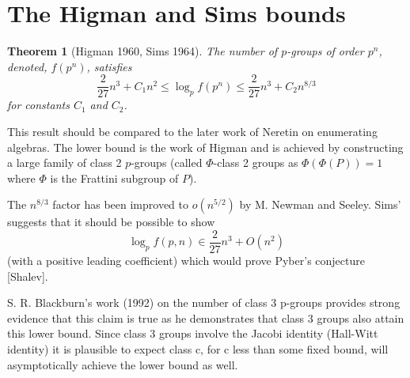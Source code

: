 \documentclass[12pt]{article}
\newtheorem{thm}{Theorem}
\begin{document}
\section{The Higman and Sims bounds}

\begin{thm}[Higman 1960, Sims 1964]
The number of $p$-groups of order $p^n$, denoted, $f(p^n)$, satisfies
	\[\frac{2}{27}n^3 + C_1 n^2 \leq \log_p f(p^n)\leq \frac{2}{27}n^3 + C_2 n^{8/3}\]
for constants $C_1$ and $C_2$.
\end{thm}

\begin{center}

\end{center}

This result should be compared to the later work of Neretin on enumerating algebras.  The lower bound is the work of Higman and is achieved by constructing a large family of class 2 $p$-groups (called $\Phi$-class 2 groups as $\Phi(\Phi(P))=1$ where $\Phi$ is the Frattini subgroup of $P$).

The $n^{8/3}$ factor has been improved to $o(n^{5/2})$ by M. Newman and
Seeley.  Sims' suggests that it should be possible to show
	\[\log_p f(p,n)\in \frac{2}{27}n^3 + O(n^2)\]
(with a positive leading coefficient) which would prove Pyber's conjecture [Shalev].

S. R. Blackburn's work (1992) on the number of class 3 p-groups 
provides strong evidence that this claim is true as he demonstrates that class 3 groups also attain this lower bound.  Since class 3 groups involve the Jacobi identity (Hall-Witt identity) it is plausible to expect class c, for c less than some fixed bound, will asymptotically achieve the lower bound as well.
\end{document}
